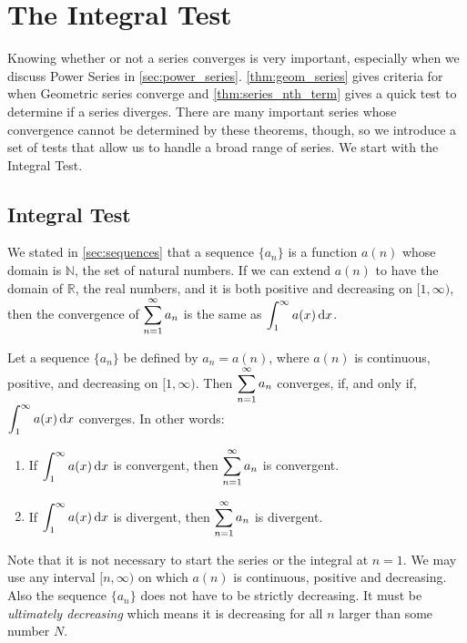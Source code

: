 \section{The Integral Test}\label{sec:int_tests}

Knowing whether or not a series converges is very important, especially when we discuss Power Series in \autoref{sec:power_series}. \autoref{thm:geom_series} gives criteria for when Geometric series converge and \autoref{thm:series_nth_term} gives a quick test to determine if a series diverges. There are many important series whose convergence cannot be determined by these theorems, though, so we introduce a set of tests that allow us to handle a broad range of series. We start with the Integral Test.


\subsection{Integral Test}

We stated in \autoref{sec:sequences} that a sequence $\{a_n\}$ is a function $a(n)$ whose domain is $\mathbb{N}$, the set of natural numbers. If we can extend $a(n)$ to have the domain of $\mathbb{R}$, the real numbers, and it is both positive and decreasing on $[1,\infty)$, then the convergence of $\displaystyle \sum_{n=1}^\infty a_n$ is the same as $\displaystyle\int_1^\infty a(x)\operatorname{d}\! x$. 

\begin{theorem}\label{thm:integral_test}%
Let a sequence $\{a_n\}$ be defined by $a_n=a(n)$, where $a(n)$ is continuous, positive, and decreasing on $[1,\infty)$. Then $\displaystyle \sum_{n=1}^\infty a_n$ converges, if, and only if, $\displaystyle\int_1^\infty a(x)\operatorname{d}\! x$ converges. In other words:
\begin{enumerate}
\item If $\displaystyle \int_1^\infty a(x)\operatorname{d}\! x$ is convergent, then $\displaystyle \sum_{n=1}^\infty a_n$ is convergent.
\item If $\displaystyle \int_1^\infty a(x)\operatorname{d}\! x$ is divergent, then $\displaystyle \sum_{n=1}^\infty a_n$ is divergent.
\end{enumerate}
\end{theorem}


Note that it is not necessary to start the series or the integral at $n=1$. We may use any interval $[n,\infty)$ on which $a(n)$ is continuous, positive and decreasing. Also the sequence $\{a_n\}$ does not have to be strictly decreasing. It must be \emph{ultimately decreasing} which means it is decreasing for all $n$ larger than some number $N$.\bigskip



